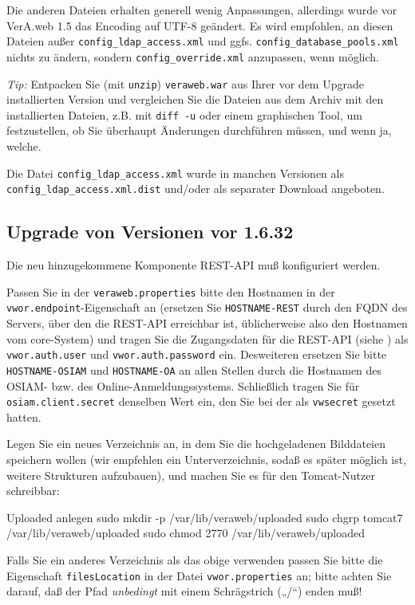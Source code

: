 Die anderen Dateien erhalten generell wenig Anpassungen, allerdings
wurde vor VerA.web 1.5 das Encoding auf UTF-8 geändert. Es wird
empfohlen, an diesen Dateien \dash außer \texttt{config\_ldap\_access.xml}
und ggfs. \texttt{config\_database\_pools.xml} \dash nichts zu ändern,
sondern \texttt{config\_override.xml} anzupassen, wenn möglich.

\emph{Tip:} Entpacken Sie (mit \texttt{unzip}) \texttt{veraweb.war}
aus Ihrer vor dem Upgrade installierten Version und vergleichen Sie
die Dateien aus dem Archiv mit den installierten Dateien, z.B. mit
\texttt{diff -u} oder einem graphischen Tool, um festzustellen, ob
Sie überhaupt Änderungen durchführen müssen, und wenn ja, welche.

Die Datei \texttt{config\_ldap\_access.xml} wurde in manchen
Versionen als \texttt{config\_ldap\_access.xml.dist} und/oder
als separater Download angeboten.
\fi%

\subsection{Upgrade von Versionen vor 1.6.32}\label{subsec:upgrade-1632}

Die neu hinzugekommene Komponente REST-API muß konfiguriert werden.

Passen Sie in der \texttt{veraweb.properties} bitte den Hostnamen
in der \texttt{vwor.endpoint}-Eigenschaft an (ersetzen Sie
\texttt{HOSTNAME-REST} durch den FQDN des Servers, über den die
REST-API erreichbar ist, üblicherweise also den Hostnamen vom
core-System) und tragen Sie die Zugangsdaten für die REST-API
(siehe ) als \texttt{vwor.auth.user}
und \texttt{vwor.auth.password} ein.
\ifoa
Desweiteren ersetzen Sie bitte \texttt{HOSTNAME-OSIAM} und
\texttt{HOSTNAME-OA} an allen Stellen durch die Hostnamen
des OSIAM- bzw. des Online-Anmeldungssystems. Schließlich
tragen Sie für \texttt{osiam.client.secret} denselben Wert
ein, den Sie bei der 
als \texttt{vwsecret} gesetzt hatten.
\fi%

\begin{minipage}{\textwidth}
Legen Sie ein neues Verzeichnis an, in dem Sie die hochgeladenen
Bilddateien speichern wollen (wir empfehlen ein Unterverzeichnis,
sodaß es später möglich ist, weitere Strukturen aufzubauen), und
machen Sie es für den Tomcat-Nutzer schreibbar:

\begin{lstdump}{Uploaded anlegen}
sudo mkdir -p /var/lib/veraweb/uploaded
sudo chgrp tomcat7 /var/lib/veraweb/uploaded
sudo chmod 2770 /var/lib/veraweb/uploaded
\end{lstdump}

Falls Sie ein anderes Verzeichnis als das obige verwenden passen
Sie bitte die Eigenschaft \texttt{filesLocation} in der Datei
\texttt{vwor.properties} an; bitte achten Sie darauf, daß der
Pfad \emph{unbedingt} mit einem Schrägstrich („/“) enden muß!
\end{minipage}

